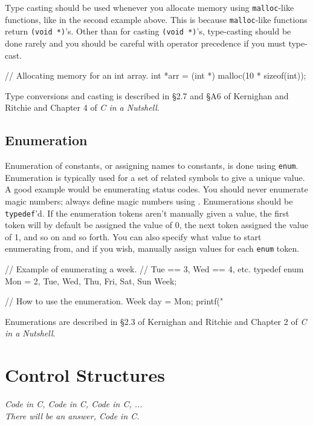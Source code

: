 \documentclass[11pt]{article}
\begin{document}
Type casting should be used whenever you allocate memory using
\texttt{malloc}-like functions, like in the second example above. This is
because \texttt{malloc}-like functions return \texttt{(void *)}'s. Other than
for casting \texttt{(void *)}'s, type-casting should be done rarely and you
should be careful with operator precedence if you must type-cast.

\begin{codelisting}{}
// Allocating memory for an int array.
int *arr = (int *) malloc(10 * sizeof(int));
\end{codelisting}

Type conversions and casting is described in \S 2.7 and \S A6 of Kernighan and
Ritchie and Chapter 4 of \emph{C in a Nutshell}.


\subsection{Enumeration}

Enumeration of constants, or assigning names to constants, is done using
\texttt{enum}. Enumeration is typically used for a set of related symbols to
give a unique value. A good example would be enumerating status codes. You
should never enumerate magic numbers; always define magic numbers using
. Enumerations should be \texttt{typedef}'d. If the enumeration
tokens aren't manually given a value, the first token will by default be
assigned the value of 0, the next token assigned the value of 1, and so on and
so forth. You can also specify what value to start enumerating from, and if you
wish, manually assign values for each \texttt{enum} token.

\begin{codelisting}
// Example of enumerating a week.
// Tue == 3, Wed == 4, etc.
typedef enum { Mon = 2, Tue, Wed, Thu, Fri, Sat, Sun } Week;

// How to use the enumeration.
Week day = Mon;
printf("%
\end{codelisting}

Enumerations are described in \S 2.3 of Kernighan and Ritchie and Chapter 2 of
\emph{C in a Nutshell}.


\section{Control Structures}

\textwidth
\epigraph{\emph{Code in C, Code in C, Code in C, ...\\ There will be an answer,
Code in C.}}{}
\end{document}
